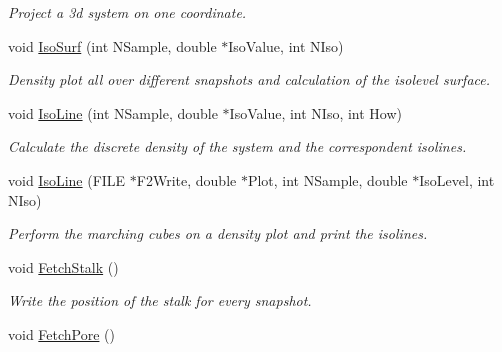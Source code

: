 \begin{DoxyCompactItemize}
\begin{DoxyCompactList}\small\item\em \-Project a 3d system on one coordinate. \end{DoxyCompactList}\item 
\hypertarget{classElPoly_a23b08e53b2acd3090051d2034632c20f}{void \hyperlink{classElPoly_a23b08e53b2acd3090051d2034632c20f}{\-Iso\-Surf} (int \-N\-Sample, double $\ast$\-Iso\-Value, int \-N\-Iso)}\label{classElPoly_a23b08e53b2acd3090051d2034632c20f}

\begin{DoxyCompactList}\small\item\em \-Density plot all over different snapshots and calculation of the isolevel surface. \end{DoxyCompactList}\item 
\hypertarget{classElPoly_a7af346569b401863e3d5f4541e85e0c4}{void \hyperlink{classElPoly_a7af346569b401863e3d5f4541e85e0c4}{\-Iso\-Line} (int \-N\-Sample, double $\ast$\-Iso\-Value, int \-N\-Iso, int \-How)}\label{classElPoly_a7af346569b401863e3d5f4541e85e0c4}

\begin{DoxyCompactList}\small\item\em \-Calculate the discrete density of the system and the correspondent isolines. \end{DoxyCompactList}\item 
\hypertarget{classElPoly_a87faf7a81fea58a62dd97ee88b5b1b84}{void \hyperlink{classElPoly_a87faf7a81fea58a62dd97ee88b5b1b84}{\-Iso\-Line} (\-F\-I\-L\-E $\ast$\-F2\-Write, double $\ast$\-Plot, int \-N\-Sample, double $\ast$\-Iso\-Level, int \-N\-Iso)}\label{classElPoly_a87faf7a81fea58a62dd97ee88b5b1b84}

\begin{DoxyCompactList}\small\item\em \-Perform the marching cubes on a density plot and print the isolines. \end{DoxyCompactList}\item 
void \hyperlink{classElPoly_a21a28de0471580af1978c3a48ae0ba0e}{\-Fetch\-Stalk} ()
\begin{DoxyCompactList}\small\item\em \-Write the position of the stalk for every snapshot. \end{DoxyCompactList}\item 
\hypertarget{classElPoly_aecd33584d71ae498798338253cbf83f0}{void \hyperlink{classElPoly_aecd33584d71ae498798338253cbf83f0}{\-Fetch\-Pore} ()}\label{classElPoly_aecd33584d71ae498798338253cbf83f0}


\end{DoxyCompactItemize}
